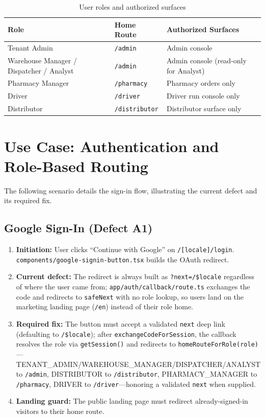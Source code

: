 \documentclass[12pt, a4paper]{article}
\begin{document}
\begin{table}[h!]
    \centering
    \caption{User roles and authorized surfaces}
    \label{tab:roles}
    \begin{tabular}{lll}
        \hline
        \textbf{Role} & \textbf{Home Route} & \textbf{Authorized Surfaces} \\
        \hline
        Tenant Admin & \texttt{/admin} & Admin console \\
        Warehouse Manager / Dispatcher / Analyst & \texttt{/admin} & Admin console (read-only for Analyst) \\
        Pharmacy Manager & \texttt{/pharmacy} & Pharmacy orders only \\
        Driver & \texttt{/driver} & Driver run console only \\
        Distributor & \texttt{/distributor} & Distributor surface only \\
        \hline
    \end{tabular}
\end{table}

\section{Use Case: Authentication and Role-Based Routing}

The following scenario details the sign-in flow, illustrating the current defect and its required fix.

\subsection{Google Sign-In (Defect A1)}

\begin{enumerate}
    \item \textbf{Initiation:} User clicks ``Continue with Google'' on \texttt{/[locale]/login}. \texttt{components/google-signin-button.tsx} builds the OAuth redirect.
    \item \textbf{Current defect:} The redirect is always built as \texttt{?next=/\${locale}} regardless of where the user came from; \texttt{app/auth/callback/route.ts} exchanges the code and redirects to \texttt{safeNext} with no role lookup, so users land on the marketing landing page (\texttt{/en}) instead of their role home.
    \item \textbf{Required fix:} The button must accept a validated \texttt{next} deep link (defaulting to \texttt{/\${locale}}); after \texttt{exchangeCodeForSession}, the callback resolves the role via \texttt{getSession()} and redirects to \texttt{homeRouteForRole(role)}---TENANT\_ADMIN/WAREHOUSE\_MANAGER/DISPATCHER/ANALYST to \texttt{/admin}, DISTRIBUTOR to \texttt{/distributor}, PHARMACY\_MANAGER to \texttt{/pharmacy}, DRIVER to \texttt{/driver}---honoring a validated \texttt{next} when supplied.
    \item \textbf{Landing guard:} The public landing page must redirect already-signed-in visitors to their home route.
\end{enumerate}
\end{document}
